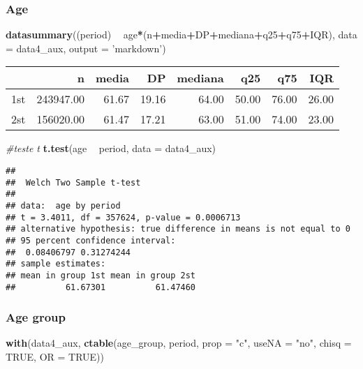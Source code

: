 \documentclass[
]{article}
\newenvironment{Shaded}{\begin{snugshade}}{\end{snugshade}}
\newcommand{\CommentTok}[1]{\textcolor[rgb]{0.56,0.35,0.01}{\textit{#1}}}
\newcommand{\DataTypeTok}[1]{\textcolor[rgb]{0.13,0.29,0.53}{#1}}
\newcommand{\KeywordTok}[1]{\textcolor[rgb]{0.13,0.29,0.53}{\textbf{#1}}}
\newcommand{\NormalTok}[1]{#1}
\newcommand{\OperatorTok}[1]{\textcolor[rgb]{0.81,0.36,0.00}{\textbf{#1}}}
\newcommand{\OtherTok}[1]{\textcolor[rgb]{0.56,0.35,0.01}{#1}}
\newcommand{\StringTok}[1]{\textcolor[rgb]{0.31,0.60,0.02}{#1}}
\begin{document}
\hypertarget{age}{%
\subsubsection{Age}\label{age}}

\begin{Shaded}
\begin{Highlighting}[]
\KeywordTok{datasummary}\NormalTok{((period) }\OperatorTok{~}\StringTok{ }\NormalTok{age}\OperatorTok{*}\NormalTok{(n}\OperatorTok{+}\NormalTok{media}\OperatorTok{+}\NormalTok{DP}\OperatorTok{+}\NormalTok{mediana}\OperatorTok{+}\NormalTok{q25}\OperatorTok{+}\NormalTok{q75}\OperatorTok{+}\NormalTok{IQR),}
            \DataTypeTok{data =}\NormalTok{ data4_aux, }\DataTypeTok{output =} \StringTok{'markdown'}\NormalTok{)}
\end{Highlighting}
\end{Shaded}

\begin{longtable}[]{@{}lrrrrrrr@{}}
\toprule
& n & media & DP & mediana & q25 & q75 & IQR\tabularnewline
\midrule
\endhead
1st & 243947.00 & 61.67 & 19.16 & 64.00 & 50.00 & 76.00 &
26.00\tabularnewline
2st & 156020.00 & 61.47 & 17.21 & 63.00 & 51.00 & 74.00 &
23.00\tabularnewline
\bottomrule
\end{longtable}

\begin{Shaded}
\begin{Highlighting}[]
\CommentTok{#teste t}
\KeywordTok{t.test}\NormalTok{(age }\OperatorTok{~}\StringTok{ }\NormalTok{period, }\DataTypeTok{data =}\NormalTok{ data4_aux)}
\end{Highlighting}
\end{Shaded}

\begin{verbatim}
## 
##  Welch Two Sample t-test
## 
## data:  age by period
## t = 3.4011, df = 357624, p-value = 0.0006713
## alternative hypothesis: true difference in means is not equal to 0
## 95 percent confidence interval:
##  0.08406797 0.31274244
## sample estimates:
## mean in group 1st mean in group 2st 
##          61.67301          61.47460
\end{verbatim}

\hypertarget{age-group}{%
\subsubsection{Age group}\label{age-group}}

\begin{Shaded}
\begin{Highlighting}[]
\KeywordTok{with}\NormalTok{(data4_aux, }\KeywordTok{ctable}\NormalTok{(age_group, period, }\DataTypeTok{prop =} \StringTok{"c"}\NormalTok{, }\DataTypeTok{useNA =} \StringTok{"no"}\NormalTok{, }\DataTypeTok{chisq =} \OtherTok{TRUE}\NormalTok{, }\DataTypeTok{OR =} \OtherTok{TRUE}\NormalTok{))}
\end{Highlighting}
\end{Shaded}
\end{document}

